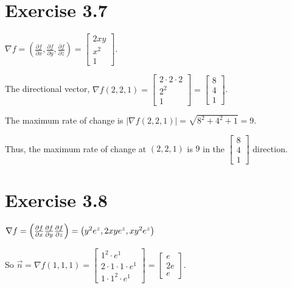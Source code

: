 \documentclass[11pt,fleqn]{book} %
\begin{document}
\section*{Exercise 3.7}

$\nabla f = \left( \frac{\partial f}{\partial x}, \frac{\partial f}{\partial y}, \frac{\partial f}{\partial z} \right) = \begin{bmatrix} 2xy \\ x^2 \\ 1 \end{bmatrix}$. 

The directional vector, $\nabla f(2, 2, 1) = \begin{bmatrix} 2 \cdot 2 \cdot 2 \\ 2^2 \\ 1 \end{bmatrix} = \begin{bmatrix} 8 \\ 4 \\ 1 \end{bmatrix}$. 

The maximum rate of change is $| \nabla f(2, 2, 1) | = \sqrt{8^2 + 4^2 + 1} = 9$. 

Thus, the maximum rate of change at $(2, 2, 1)$ is $9$ in the $\begin{bmatrix} 8 \\ 4 \\ 1 \end{bmatrix}$ direction. 

\section*{Exercise 3.8}

$\nabla f  = \left( \frac{\partial f}{\partial x} \\ \frac{\partial f}{\partial y} \\ \frac{\partial f}{\partial z} \right) = \left( y^2e^z, 2xye^z, xy^2e^z \right)$

So $\vec{n} = \nabla f(1,1,1) = \begin{bmatrix} 1^2 \cdot e^1 \\ 2 \cdot 1 \cdot 1 \cdot e^1 \\ 1 \cdot 1^2 \cdot e^1 \end{bmatrix} = \begin{bmatrix} e \\ 2e \\ e \end{bmatrix}$.
\end{document}
